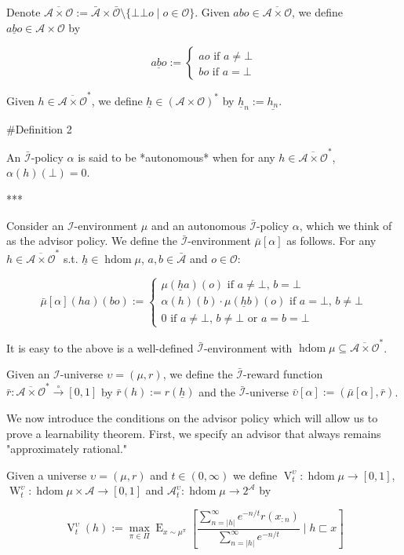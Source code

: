 \documentclass[a4paper]{article}
\DeclareMathOperator{\E}{E}
\newcommand{\Abs}[1]{\lvert #1 \rvert}
\newcommand{\PF}{\xrightarrow{\circ}}
\newcommand{\Ob}{\mathcal{O}}
\newcommand{\A}{\mathcal{A}}
\newcommand{\I}{\mathcal{I}}
\newcommand{\FH}{(\A \times \Ob)^*}
\newcommand{\Ado}{\bar{\Ob}}
\newcommand{\Ada}{\bar{\A}}
\newcommand{\Adi}{\bar{\I}}
\newcommand{\Adao}{\overline{\A \times \Ob}}
\newcommand{\Adfh}{\Adao^*}
\DeclareMathOperator{\HD}{hdom}
\newcommand{\V}{\operatorname{V}}
\newcommand{\W}{\operatorname{W}}
\begin{document}
Denote $\Adao:= \Ada \times \Ado \setminus \{\bot\bot o \mid o \in \Ob\}$. Given $abo \in \Adao$, we define $\underline{abo} \in \A \times \Ob$ by

$$\underline{abo}:=\begin{cases} ao \text{ if } a\ne\bot \\ bo \text{ if } a=\bot \end{cases}$$

Given $h \in \Adfh$, we define $\underline{h} \in \FH$ by $\underline{h}_n:=\underline{h_n}$. 

\#Definition 2

An $\Adi$-policy $\alpha$ is said to be *autonomous* when for any $h \in \Adfh$, $\alpha(h)(\bot)=0$.

***

Consider an $\I$-environment $\mu$ and an autonomous $\Adi$-policy $\alpha$, which we think of as the advisor policy. We define the $\Adi$-environment $\bar{\mu}[\alpha]$ as follows. For any $h \in \Adfh$ s.t. $\underline{h} \in \HD \mu$, $a,b \in \Ada$ and $o \in \Ob$:

$$\bar{\mu}[\alpha](ha)(bo):=\begin{cases} \mu(\underline{h}a)(o) \text{ if } a\ne\bot,\, b=\bot \\ \alpha(h)(b)\cdot\mu(\underline{h}b)(o) \text{ if } a=\bot,\,b\ne\bot \\ 0 \text{ if } a\ne\bot,\, b\ne\bot \text{ or } a=b=\bot \end{cases}$$

It is easy to the above is a well-defined $\Adi$-environment with $\HD \mu \subseteq \Adfh$. 

Given an $\I$-universe $\upsilon=(\mu,r)$, we define the $\Adi$-reward function $\bar{r}: \Adfh \PF [0,1]$ by $\bar{r}(h):=r(\underline{h})$ and the $\Adi$-universe $\bar{\upsilon}[\alpha]:=(\bar{\mu}[\alpha],\bar{r})$.

We now introduce the conditions on the advisor policy which will allow us to prove a learnability theorem. First, we specify an advisor that always remains "approximately rational."

Given a universe $\upsilon=(\mu,r)$ and $t \in (0, \infty)$ we define $\V_t^\upsilon: \HD{\mu} \rightarrow [0,1]$, $\W_t^\upsilon: \HD{\mu} \times \A \rightarrow [0,1]$ and $\A^\upsilon_t: \HD{\mu} \rightarrow 2^\A$ by

$$\V_t^\upsilon(h):=\max_{\pi \in \Pi} {\E_{x \sim \mu^\pi}[\frac{\sum_{n=\Abs{h}}^\infty e^{-n/t} r(x_{:n})}{\sum_{n=\Abs{h}}^\infty e^{-n/t}} \mid h \sqsubset x]}$$
\end{document}

